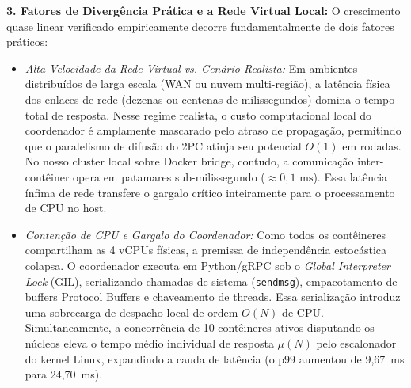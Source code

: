 \documentclass[conference]{IEEEtran}
\begin{document}
\textbf{3. Fatores de Divergência Prática e a Rede Virtual Local:} O crescimento quase linear verificado empiricamente decorre fundamentalmente de dois fatores práticos:
\begin{itemize}
  \item \textit{Alta Velocidade da Rede Virtual vs. Cenário Realista:} Em ambientes distribuídos de larga escala (WAN ou nuvem multi-região), a latência física dos enlaces de rede (dezenas ou centenas de milissegundos) domina o tempo total de resposta. Nesse regime realista, o custo computacional local do coordenador é amplamente mascarado pelo atraso de propagação, permitindo que o paralelismo de difusão do 2PC atinja seu potencial $O(1)$ em rodadas. No nosso cluster local sobre Docker bridge, contudo, a comunicação inter-contêiner opera em patamares sub-milissegundo ($\approx 0{,}1\text{ ms}$). Essa latência ínfima de rede transfere o gargalo crítico inteiramente para o processamento de CPU no host.
  \item \textit{Contenção de CPU e Gargalo do Coordenador:} Como todos os contêineres compartilham as 4 vCPUs físicas, a premissa de independência estocástica colapsa. O coordenador executa em Python/gRPC sob o \textit{Global Interpreter Lock} (GIL), serializando chamadas de sistema (\texttt{sendmsg}), empacotamento de buffers Protocol Buffers e chaveamento de threads. Essa serialização introduz uma sobrecarga de despacho local de ordem $O(N)$ de CPU. Simultaneamente, a concorrência de 10 contêineres ativos disputando os núcleos eleva o tempo médio individual de resposta $\mu(N)$ pelo escalonador do kernel Linux, expandindo a cauda de latência (o p99 aumentou de 9,67~ms para 24,70~ms).
\end{itemize}
\end{document}
